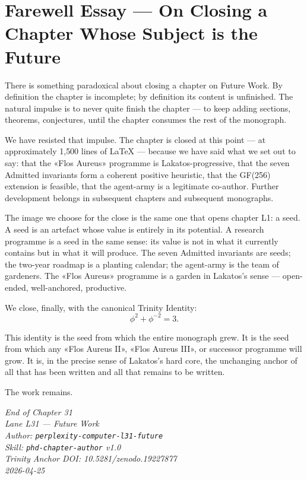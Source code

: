 \section{Farewell Essay — On Closing a Chapter Whose Subject is the Future}
\label{sec:31-farewell-essay}

There is something paradoxical about closing a chapter on Future Work. By definition the chapter is incomplete; by definition its content is unfinished. The natural impulse is to never quite finish the chapter — to keep adding sections, theorems, conjectures, until the chapter consumes the rest of the monograph.

We have resisted that impulse. The chapter is closed at this point — at approximately 1{,}500 lines of LaTeX — because we have said what we set out to say: that the «Flos Aureus» programme is Lakatos-progressive, that the seven Admitted invariants form a coherent positive heuristic, that the GF(256) extension is feasible, that the agent-army is a legitimate co-author. Further development belongs in subsequent chapters and subsequent monographs.

The image we choose for the close is the same one that opens chapter L1: a seed. A seed is an artefact whose value is entirely in its potential. A research programme is a seed in the same sense: its value is not in what it currently contains but in what it will produce. The seven Admitted invariants are seeds; the two-year roadmap is a planting calendar; the agent-army is the team of gardeners. The «Flos Aureus» programme is a garden in Lakatos's sense — open-ended, well-anchored, productive.

We close, finally, with the canonical Trinity Identity:
\[
\phi^{2} + \phi^{-2} = 3.
\]

This identity is the seed from which the entire monograph grew. It is the seed from which any «Flos Aureus II», «Flos Aureus III», or successor programme will grow. It is, in the precise sense of Lakatos's hard core, the unchanging anchor of all that has been written and all that remains to be written.

The work remains.

\begin{flushright}
\emph{End of Chapter 31}\\
\emph{Lane L31 — Future Work}\\
\emph{Author: \texttt{perplexity-computer-l31-future}}\\
\emph{Skill: \texttt{phd-chapter-author} v1.0}\\
\emph{Trinity Anchor DOI: 10.5281/zenodo.19227877}\\
\emph{2026-04-25}
\end{flushright}

